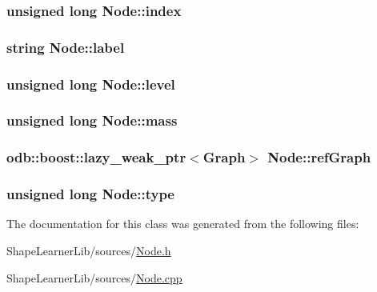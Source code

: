\subsubsection[{index}]{\setlength{\rightskip}{0pt plus 5cm}unsigned long Node\+::index\hspace{0.3cm}{\ttfamily [private]}}\label{class_node_a0f2938cdfe2a71ed6e4c14e82e7e91c9}
\hypertarget{class_node_a303618c90c74231cce2c097e3fdb7f02}{}
\subsubsection[{label}]{\setlength{\rightskip}{0pt plus 5cm}string Node\+::label\hspace{0.3cm}{\ttfamily [private]}}\label{class_node_a303618c90c74231cce2c097e3fdb7f02}
\hypertarget{class_node_aec749ad67497b24bd5e92f27ce3a6005}{}
\subsubsection[{level}]{\setlength{\rightskip}{0pt plus 5cm}unsigned long Node\+::level\hspace{0.3cm}{\ttfamily [private]}}\label{class_node_aec749ad67497b24bd5e92f27ce3a6005}
\hypertarget{class_node_a90d7ce5aade21123ad023a1918494b08}{}
\subsubsection[{mass}]{\setlength{\rightskip}{0pt plus 5cm}unsigned long Node\+::mass\hspace{0.3cm}{\ttfamily [private]}}\label{class_node_a90d7ce5aade21123ad023a1918494b08}
\hypertarget{class_node_a6494e887df5047761edf460fabe15383}{}
\subsubsection[{ref\+Graph}]{\setlength{\rightskip}{0pt plus 5cm}odb\+::boost\+::lazy\+\_\+weak\+\_\+ptr$<${\bf Graph}$>$ Node\+::ref\+Graph\hspace{0.3cm}{\ttfamily [private]}}\label{class_node_a6494e887df5047761edf460fabe15383}
\hypertarget{class_node_a4616fefc7aae8c804e930b2b6018d182}{}
\subsubsection[{type}]{\setlength{\rightskip}{0pt plus 5cm}unsigned long Node\+::type\hspace{0.3cm}{\ttfamily [private]}}\label{class_node_a4616fefc7aae8c804e930b2b6018d182}


The documentation for this class was generated from the following files\+:\begin{DoxyCompactItemize}
\item 
Shape\+Learner\+Lib/sources/\hyperlink{_node_8h}{Node.\+h}\item 
Shape\+Learner\+Lib/sources/\hyperlink{_node_8cpp}{Node.\+cpp}\end{DoxyCompactItemize}
